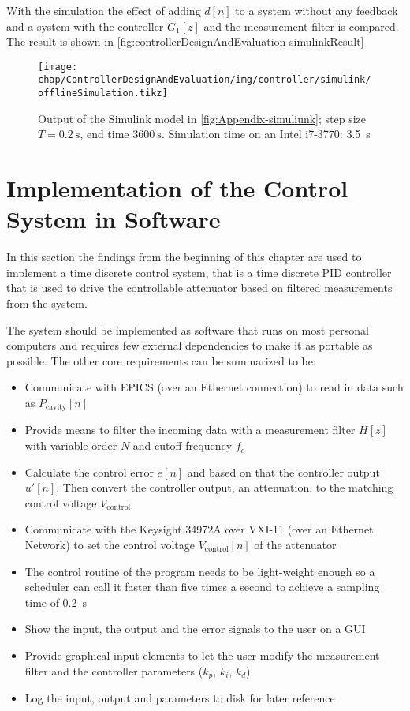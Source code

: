 With the simulation the effect of adding $d[n]$ to a system without any feedback and a system with the controller $G_1[z]$ and the measurement filter is compared. The result is shown in \autoref{fig:controllerDesignAndEvaluation-simulinkResult}

\begin{figure}[tb]
	\centering
	\texttt{[image: chap/ControllerDesignAndEvaluation/img/controller/simulink/offlineSimulation.tikz]}
	\caption{Output of the Simulink model in \autoref{fig:Appendix-simuliunk}; step size $T=\SI{0.2}{\second}$, end time $\SI{3600}{\second}$. Simulation time on an Intel i7-3770: \SI{3.5}{\second}}
	\label{fig:controllerDesignAndEvaluation-simulinkResult}
\end{figure}







\newpage
\section{Implementation of the Control System in Software}
In this section the findings from the beginning of this chapter are used to implement a time discrete control system, that is a time discrete PID controller that is used to drive the controllable attenuator based on filtered measurements from the system.

The system should be implemented as software that runs on most personal computers and requires few external dependencies to make it as portable as possible. The other core requirements can be summarized to be:
\begin{itemize}
\item Communicate with EPICS (over an Ethernet connection) to read in data such as $P_\text{cavity}[n]$
\item Provide means to filter the incoming data with a measurement filter $H[z]$ with variable order $N$ and cutoff frequency $f_c$
\item Calculate the control error $e[n]$ and based on that the controller output $u'[n]$. Then convert the controller output, an attenuation, to the matching control voltage $V_\text{control}$
\item Communicate with the Keysight 34972A over VXI-11 (over an Ethernet Network) to set the control voltage $V_\text{control}[n]$ of the attenuator
\item The control routine of the program needs to be light-weight enough so a scheduler can call it faster than five times a second to achieve a sampling time of \SI{0.2}{\second}
\item Show the input, the output and the error signals to the user on a GUI
\item Provide graphical input elements to let the user modify the measurement filter and the controller parameters ($k_p$, $k_i$, $k_d$)
\item Log the input, output and parameters to disk for later reference
\end{itemize}

